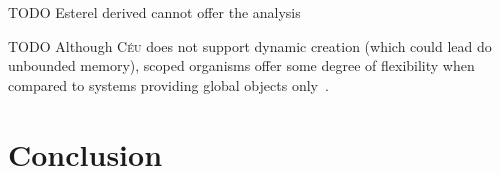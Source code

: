 \documentclass[10pt]{sensys-proc}
\newcommand{\CEU}{\textsc{C\'{e}u}\xspace}
\newcommand{\code}[1] {{\small{\texttt{#1}}}}
\newcommand{\Code}[1] {\texttt{#1}}
\begin{document}
TODO
Esterel derived cannot offer the analysis

TODO
Although \CEU does not support dynamic creation (which could lead do unbounded 
memory), scoped organisms offer some degree of flexibility when compared to 
systems providing global objects only~\cite{wsn.virgil,wsn.flowtalk}.
\section{Conclusion}
\label{sec.conclusion}


\begin{comment}
CONCLUSION
Note that one of the main objectives of \CEU is to enhance safety in concurrent 
patterns, in the sense that if the programmer sticks to \CEU primitives for 
control patterns it will gain...
avoid cycles
The stack execution policy for internal events can express nested emits, and 
also avoids dependency cycles in programs.

In \CEU, there are three possible sources of non-determinism:
\emph{concurrent access to variables} (e.g. \code{(1=>a\&\&2=>a)}),
\emph{concurrent \emph{par/or} termination} (e.g. \code{(1||2)=>a}, might yield 
$1$ or $2$), and \emph{concurrent loop escape}%
\footnote{ The token \brk{} escapes the innermost loop with its preceding 
expression. }
(e.g. \code{(1\brk{} \&\& 2\brk)* =>a}).

During compile time, \CEU{} converts programs into deterministic finite 
automatons in order to detect the three forms of non-determinism.
This conversion is the reason why \CEU{} is a static language.
A DFA unequivocally represents a \CEU{} program, covering exactly all possible 
paths it can reach during runtime.
For instance, the following program is identified as non-deterministic, because 
the variable $v$ is accessed concurrently on the 6th occurrence of the event 
$A$:

\Code{
(\til{}A; \til{}A; 1=>v)*
\&\&
(\til{}A; \til{}A; \til{}A; v)*
}

\end{comment}
\end{document}
